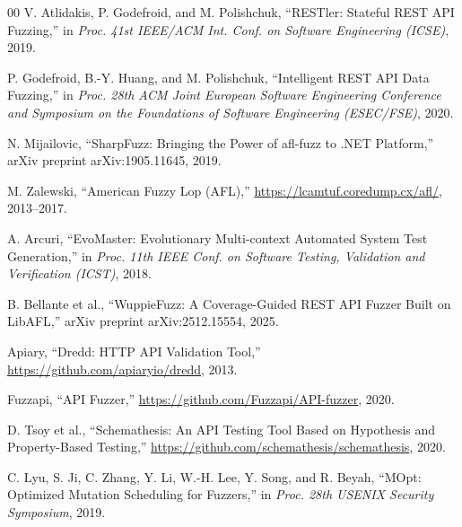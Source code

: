 \documentclass[conference]{IEEEtran}
\begin{document}
\begin{thebibliography}{00}
V. Atlidakis, P. Godefroid, and M. Polishchuk, ``RESTler: Stateful REST API Fuzzing,'' in \textit{Proc. 41st IEEE/ACM Int. Conf. on Software Engineering (ICSE)}, 2019.

P. Godefroid, B.-Y. Huang, and M. Polishchuk, ``Intelligent REST API Data Fuzzing,'' in \textit{Proc. 28th ACM Joint European Software Engineering Conference and Symposium on the Foundations of Software Engineering (ESEC/FSE)}, 2020.

N. Mijailovic, ``SharpFuzz: Bringing the Power of afl-fuzz to .NET Platform,'' arXiv preprint arXiv:1905.11645, 2019.

M. Zalewski, ``American Fuzzy Lop (AFL),'' \url{https://lcamtuf.coredump.cx/afl/}, 2013--2017.

A. Arcuri, ``EvoMaster: Evolutionary Multi-context Automated System Test Generation,'' in \textit{Proc. 11th IEEE Conf. on Software Testing, Validation and Verification (ICST)}, 2018.

B. Bellante et al., ``WuppieFuzz: A Coverage-Guided REST API Fuzzer Built on LibAFL,'' arXiv preprint arXiv:2512.15554, 2025.

Apiary, ``Dredd: HTTP API Validation Tool,'' \url{https://github.com/apiaryio/dredd}, 2013.

Fuzzapi, ``API Fuzzer,'' \url{https://github.com/Fuzzapi/API-fuzzer}, 2020.

D. Tsoy et al., ``Schemathesis: An API Testing Tool Based on Hypothesis and Property-Based Testing,'' \url{https://github.com/schemathesis/schemathesis}, 2020.

C. Lyu, S. Ji, C. Zhang, Y. Li, W.-H. Lee, Y. Song, and R. Beyah, ``MOpt: Optimized Mutation Scheduling for Fuzzers,'' in \textit{Proc. 28th USENIX Security Symposium}, 2019.

\end{thebibliography}
\end{document}
